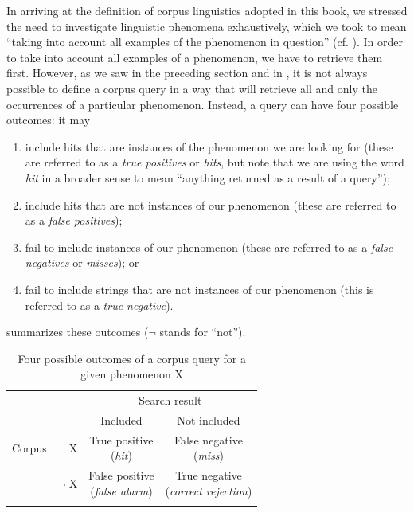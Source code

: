 In arriving at the definition of corpus linguistics adopted in this book, we stressed the need to investigate linguistic phenomena exhaustively, which we took to mean ``taking into account all examples of the phenomenon in question'' (cf. ). In order to take into account all examples of a phenomenon, we have to retrieve  them first. However, as we saw in the preceding section and in , it is not always possible to define a corpus query  in a way that will retrieve all and only the occurrences of a particular phenomenon. Instead, a query can have four possible outcomes: it may

\begin{enumerate}
\item include hits  that are instances of the phenomenon we are looking for (these are referred to as a \textit{true positives} or \textit{hits}, but note that we are using the word \textit{hit} in a broader sense to mean ``anything returned as a result of a  query'');
\item include hits  that are not instances of our phenomenon (these are referred to as a \textit{false positives});
\item fail to include instances of our phenomenon (these are referred to as a \textit{false negatives} or \textit{misses}); or
\item fail to include strings that are not instances of our phenomenon (this is referred to as a \textit{true negative}).
\end{enumerate}

 summarizes these outcomes ($\lnot$ stands for ``not'').

\begin{table}
\caption{Four possible outcomes of a corpus query for a given phenomenon X}
\label{tab:queryoutcomes}
\begin{tabular}[t]{lrcc}
\lsptoprule
 & & \multicolumn{2}{c}{Search result} \\
 & & Included & Not included \\
\midrule
Corpus & X & \makecell[t]{True positive \\ \footnotesize{(\textit{hit})}} & \makecell[t]{False negative \\ \footnotesize{(\textit{miss})}} \\
 & $\lnot$ X & \makecell[t]{False positive \\ \footnotesize{(\textit{false alarm})}} & \makecell[t]{True negative \\ \footnotesize{(\textit{correct rejection})}} \\
\lspbottomrule
\end{tabular}
\end{table}

